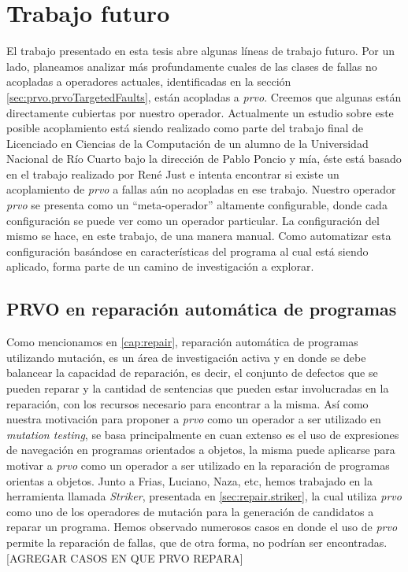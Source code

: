 \chapter[Trabajo futuro]{Trabajo futuro}
\label{cap:futurework}

El trabajo presentado en esta tesis abre algunas l\'ineas de trabajo futuro. Por un lado, planeamos analizar m\'as profundamente cuales de las clases de fallas no acopladas a operadores actuales, identificadas en la secci\'on \ref{sec:prvo.prvoTargetedFaults}, est\'an acopladas a \emph{prvo}. Creemos que algunas est\'an directamente cubiertas por nuestro operador. Actualmente un estudio sobre este posible acoplamiento est\'a siendo realizado como parte del trabajo final de Licenciado en Ciencias de la Computaci\'on de un alumno de la Universidad Nacional de R\'io Cuarto bajo la direcci\'on de Pablo Poncio y m\'ia, \'este est\'a basado en el trabajo realizado por Ren\'e Just \cite{bibliography.mutation.evaluation.valid-substitute} e intenta encontrar si existe un acoplamiento de \emph{prvo} a fallas a\'un no acopladas en ese trabajo. Nuestro operador \emph{prvo} se presenta como un ``meta-operador'' altamente configurable, donde cada configuraci\'on se puede ver como un operador particular. La configuraci\'on del mismo se hace, en este trabajo, de una manera manual. Como automatizar esta configuraci\'on bas\'andose en caracter\'isticas del programa al cual est\'a siendo aplicado, forma parte de un camino de investigaci\'on a explorar. 

\section{PRVO en reparaci\'on autom\'atica de programas}

Como mencionamos en \ref{cap:repair}, reparaci\'on autom\'atica de programas utilizando mutaci\'on, es un \'area de investigaci\'on activa y en donde se debe balancear la capacidad de reparaci\'on, es decir, el conjunto de defectos que se pueden reparar y la cantidad de sentencias que pueden estar involucradas en la reparaci\'on, con los recursos necesario para encontrar a la misma. As\'i como nuestra motivaci\'on para proponer a \emph{prvo} como un operador a ser utilizado en \emph{mutation testing}, se basa principalmente en cuan extenso es el uso de expresiones de navegaci\'on en programas orientados a objetos, la misma puede aplicarse para motivar a \emph{prvo} como un operador a ser utilizado en la reparaci\'on de programas orientas a objetos. Junto a Frias, Luciano, Naza, etc, hemos trabajado en la herramienta llamada \emph{Striker}, presentada en \ref{sec:repair.striker}, la cual utiliza \emph{prvo} como uno de los operadores de mutaci\'on para la generaci\'on de candidatos a reparar un programa. Hemos observado numerosos casos en donde el uso de \emph{prvo} permite la reparaci\'on de fallas, que de otra forma, no podr\'ian ser encontradas. [AGREGAR CASOS EN QUE PRVO REPARA]